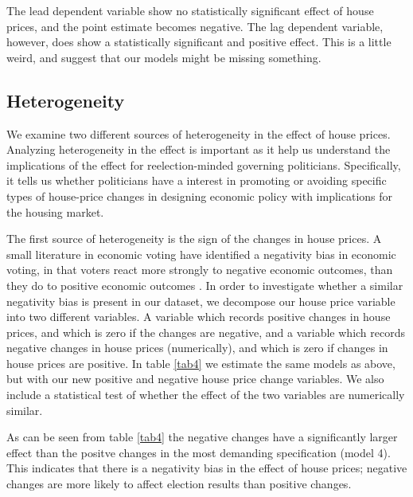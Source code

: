 \documentclass[12pt,a4paper]{article}
\begin{document}





The lead dependent variable show no statistically significant effect of house prices, and the point estimate 
becomes negative. The lag dependent variable, however, does show a statistically significant and positive effect. This is a little weird, and suggest that our models might be missing something. 



\subsection{Heterogeneity}

We examine two different sources of heterogeneity in the effect of house prices. Analyzing heterogeneity in the effect is important as it help us understand the implications  of the effect for reelection-minded governing politicians. Specifically, it tells us whether politicians have a interest in promoting or avoiding  specific types of house-price changes in designing economic policy with implications for the housing market. %

The first source of heterogeneity is the sign of the changes in house prices. A small literature in economic voting have identified a negativity bias in economic voting, in that voters react more strongly to negative economic outcomes, than they do to positive economic outcomes \citep[e.g.][]{bloom1975voter}. In order to investigate whether a similar negativity bias is present in our dataset, we decompose our house price variable into two different variables. A variable which records positive changes in house prices, and which is zero if the changes are negative, and a variable which records negative changes in house prices (numerically), and which is zero if changes in house prices are positive. In table \ref{tab4} we estimate the same models as above, but with our new positive and negative house price change variables. We also include a statistical test of whether the effect of the two variables are numerically similar. 

As can be seen from table \ref{tab4} the negative changes have a significantly larger effect than the positve changes in the most demanding specification (model 4). This indicates that there is a negativity bias in the effect of house prices; negative changes are more likely to affect election results than positive changes. 
\end{document}
